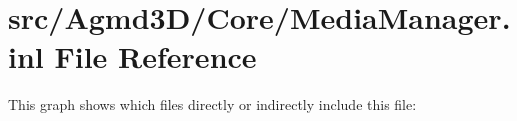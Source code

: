 \hypertarget{_media_manager_8inl}{\section{src/\+Agmd3\+D/\+Core/\+Media\+Manager.inl File Reference}
\label{_media_manager_8inl}
}
This graph shows which files directly or indirectly include this file\+:
